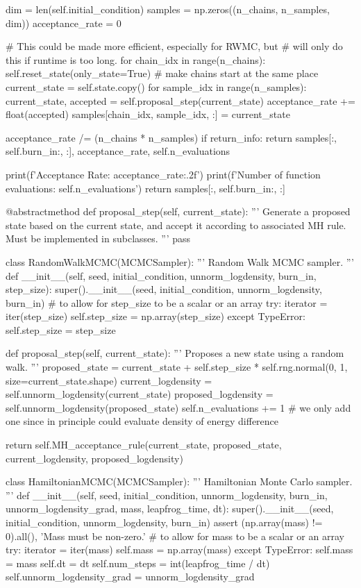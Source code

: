 \documentclass[a4paper, 12pt,oneside]{article}
\begin{document}
\begin{python}
				dim = len(self.initial_condition)
				samples = np.zeros((n_chains, n_samples, dim))
				acceptance_rate = 0
				
				# This could be made more efficient, especially for RWMC, but 
				# will only do this if runtime is too long.
				for chain_idx in range(n_chains):
					self.reset_state(only_state=True) # make chains start at the same place
					current_state = self.state.copy()
					for sample_idx in range(n_samples):
						current_state, accepted = self.proposal_step(current_state)
						acceptance_rate += float(accepted)
						samples[chain_idx, sample_idx, :] = current_state
				
				acceptance_rate /= (n_chains * n_samples)
				if return_info:
					return samples[:, self.burn_in:, :], acceptance_rate, self.n_evaluations

				print(f'Acceptance Rate: {acceptance_rate:.2f}')
				print(f'Number of function evaluations: {self.n_evaluations}')
				return samples[:, self.burn_in:, :]
			
			@abstractmethod
			def proposal_step(self, current_state):
				'''
				Generate a proposed state based on the current state, and accept it according to associated MH rule.
				Must be implemented in subclasses.
				'''
				pass

		class RandomWalkMCMC(MCMCSampler):
			'''
			Random Walk MCMC sampler.
			'''
			def __init__(self, seed, initial_condition, unnorm_logdensity, burn_in, step_size):
				super().__init__(seed, initial_condition, unnorm_logdensity, burn_in)
				# to allow for step_size to be a scalar or an array
				try:
					iterator = iter(step_size)
					self.step_size = np.array(step_size)
				except TypeError:
					self.step_size = step_size
			
			def proposal_step(self, current_state):
				'''
				Proposes a new state using a random walk.
				'''
				proposed_state = current_state + self.step_size * self.rng.normal(0, 1, size=current_state.shape)
				current_logdensity = self.unnorm_logdensity(current_state)
				proposed_logdensity = self.unnorm_logdensity(proposed_state)
				self.n_evaluations += 1 
				# we only add one since in principle could evaluate density of energy difference

				return self.MH_acceptance_rule(current_state, proposed_state, current_logdensity, proposed_logdensity)

		class HamiltonianMCMC(MCMCSampler):
			'''
			Hamiltonian Monte Carlo sampler.
			'''
			def __init__(self, seed, initial_condition, unnorm_logdensity, burn_in, unnorm_logdensity_grad, mass, leapfrog_time, dt):
				super().__init__(seed, initial_condition, unnorm_logdensity, burn_in)
				assert (np.array(mass) != 0).all(), 'Mass must be non-zero.'
				# to allow for mass to be a scalar or an array
				try:
					iterator = iter(mass)
					self.mass = np.array(mass)
				except TypeError:
					self.mass = mass
				self.dt = dt
				self.num_steps = int(leapfrog_time / dt)
				self.unnorm_logdensity_grad = unnorm_logdensity_grad
			

\end{python}
\end{document}
